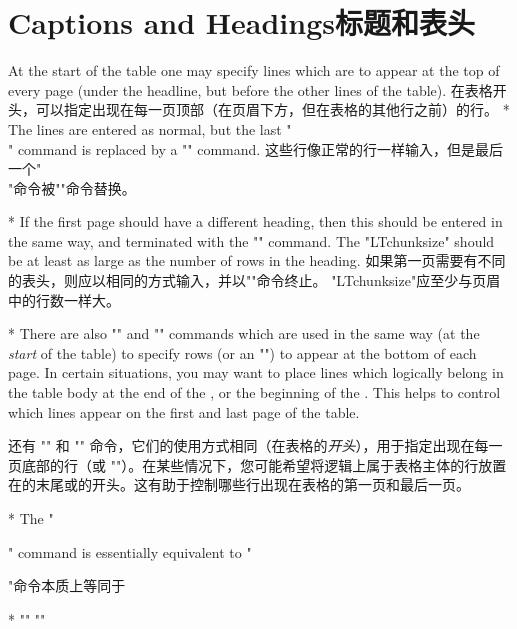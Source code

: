\section{Captions and Headings\hfill 标题和表头}
\begin{paracol}{2}
\DescribeMacro{\endhead}
At the start of the table one may specify lines which are to appear at
the top of every page (under the headline, but before the other lines
of the table).
\switchcolumn 
\DescribeMacro{\endhead}
在表格开头，可以指定出现在每一页顶部（在页眉下方，但在表格的其他行之前）的行。
\switchcolumn[0]*
The lines are entered as normal, but the last "\\" command is
replaced by a "\endhead" command.
\switchcolumn 这些行像正常的行一样输入，但是最后一个"\\"命令被"\endhead"命令替换。 

\switchcolumn[0]*
\DescribeMacro{\endfirsthead}
If the first page should have a different heading, then this should be
entered in the same way, and terminated with the "\endfirsthead"
command. The "LTchunksize" should be at least as large as the
number of rows in the heading.
\switchcolumn 
\DescribeMacro{\endfirsthead}
如果第一页需要有不同的表头，则应以相同的方式输入，并以"\endfirsthead"命令终止。 "LTchunksize"应至少与页眉中的行数一样大。

\switchcolumn[0]*
\DescribeMacro{\endfoot}
There are also "\endfoot" and "\endlastfoot"
\DescribeMacro{\endlastfoot}
commands which are used in the same way (at the \emph{start} of the
table) to specify rows (or an "\hline") to appear at the bottom of
each page. In certain situations, you may want to place lines which
logically belong in the table body at the end of the ,
or the beginning of the . This helps to control which
lines appear on the first and last page of the table.\switchcolumn 

还有 "\endfoot" 和 "\endlastfoot" 命令，它们的使用方式相同（在表格的\emph{开头}），用于指定出现在每一页底部的行（或 "\hline"）。在某些情况下，您可能希望将逻辑上属于表格主体的行放置在的末尾或的开头。这有助于控制哪些行出现在表格的第一页和最后一页。

\switchcolumn[0]*
\DescribeMacro{\caption}%
The "\caption{...}" command is essentially equivalent to\switchcolumn
"\caption{...}"命令本质上等同于

\switchcolumn[0]*
""
\switchcolumn
""


\end{paracol}
